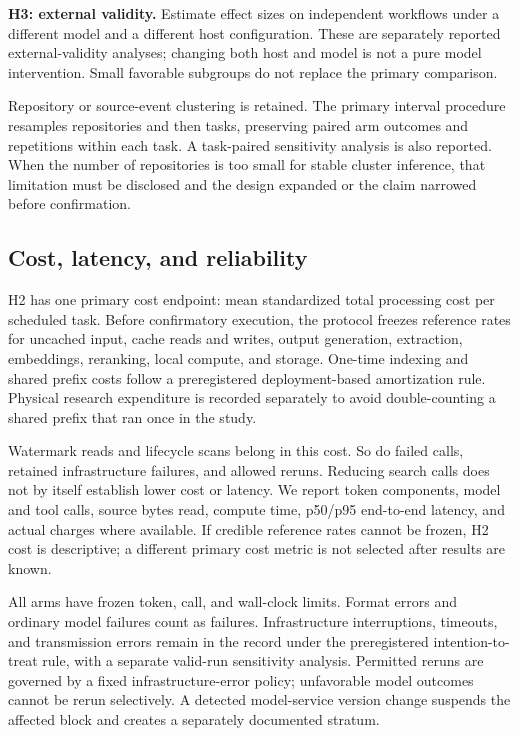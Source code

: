 \textbf{H3: external validity.} Estimate effect sizes on independent
workflows under a different model and a different host configuration.
These are separately reported external-validity analyses; changing both
host and model is not a pure model intervention. Small favorable
subgroups do not replace the primary comparison.

Repository or source-event clustering is retained. The primary interval
procedure resamples repositories and then tasks, preserving paired arm
outcomes and repetitions within each task. A task-paired sensitivity
analysis is also reported. When the number of repositories is too small
for stable cluster inference, that limitation must be disclosed and the
design expanded or the claim narrowed before confirmation.

\subsection{Cost, latency, and
reliability}\label{cost-latency-and-reliability}

H2 has one primary cost endpoint: mean standardized total processing
cost per scheduled task. Before confirmatory execution, the protocol
freezes reference rates for uncached input, cache reads and writes,
output generation, extraction, embeddings, reranking, local compute, and
storage. One-time indexing and shared prefix costs follow a
preregistered deployment-based amortization rule. Physical research
expenditure is recorded separately to avoid double-counting a shared
prefix that ran once in the study.

Watermark reads and lifecycle scans belong in this cost. So do failed
calls, retained infrastructure failures, and allowed reruns. Reducing
search calls does not by itself establish lower cost or latency. We
report token components, model and tool calls, source bytes read,
compute time, p50/p95 end-to-end latency, and actual charges where
available. If credible reference rates cannot be frozen, H2 cost is
descriptive; a different primary cost metric is not selected after
results are known.

All arms have frozen token, call, and wall-clock limits. Format errors
and ordinary model failures count as failures. Infrastructure
interruptions, timeouts, and transmission errors remain in the record
under the preregistered intention-to-treat rule, with a separate
valid-run sensitivity analysis. Permitted reruns are governed by a fixed
infrastructure-error policy; unfavorable model outcomes cannot be rerun
selectively. A detected model-service version change suspends the
affected block and creates a separately documented stratum.

